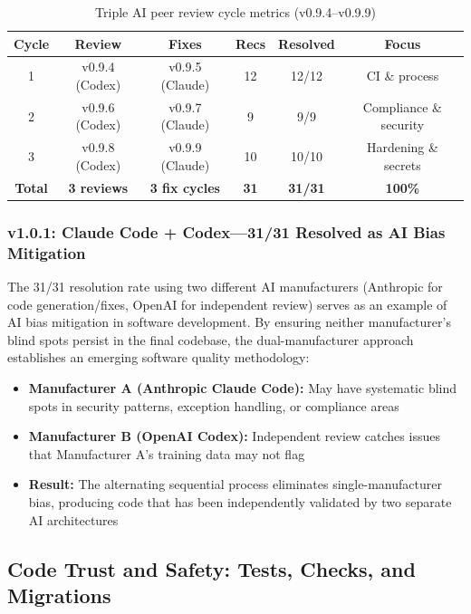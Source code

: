 \begin{table}[H]
\centering
\caption{Triple AI peer review cycle metrics (v0.9.4--v0.9.9)}
\label{tab:peerreview}
\small
\begin{tabular}{@{}cccccc@{}}
\toprule
\textbf{Cycle} & \textbf{Review} & \textbf{Fixes} & \textbf{Recs} & \textbf{Resolved} & \textbf{Focus} \\
\midrule
1 & v0.9.4 (Codex) & v0.9.5 (Claude) & 12 & 12/12 & CI \& process \\
2 & v0.9.6 (Codex) & v0.9.7 (Claude) & 9 & 9/9 & Compliance \& security \\
3 & v0.9.8 (Codex) & v0.9.9 (Claude) & 10 & 10/10 & Hardening \& secrets \\
\midrule
\textbf{Total} & \textbf{3 reviews} & \textbf{3 fix cycles} & \textbf{31} & \textbf{31/31} & \textbf{100\%} \\
\bottomrule
\end{tabular}
\end{table}

\subsubsection{v1.0.1: Claude Code + Codex---31/31 Resolved as AI Bias Mitigation}

The 31/31 resolution rate using two different AI manufacturers (Anthropic for code generation/fixes, OpenAI for independent review) serves as an example of AI bias mitigation in software development. By ensuring neither manufacturer's blind spots persist in the final codebase, the dual-manufacturer approach establishes an emerging software quality methodology:
\begin{itemize}
  \item \textbf{Manufacturer A (Anthropic Claude Code):} May have systematic blind spots in security patterns, exception handling, or compliance areas
  \item \textbf{Manufacturer B (OpenAI Codex):} Independent review catches issues that Manufacturer A's training data may not flag
  \item \textbf{Result:} The alternating sequential process eliminates single-manufacturer bias, producing code that has been independently validated by two separate AI architectures
\end{itemize}

\subsection{Code Trust and Safety: Tests, Checks, and Migrations}
\label{sec:codetrust}

